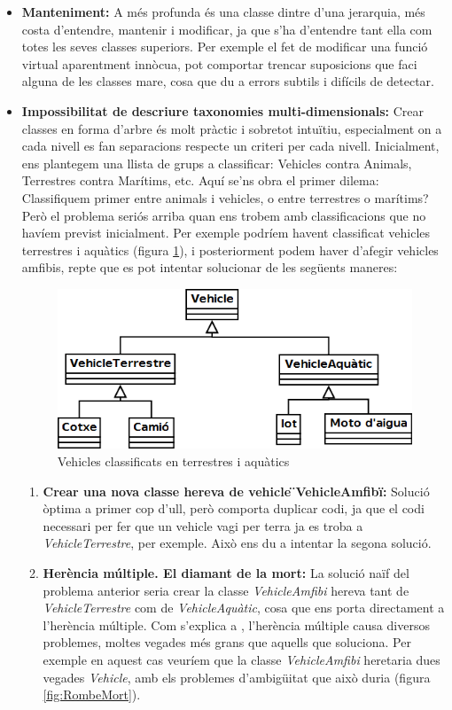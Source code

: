 \begin{itemize}
  \item {\bf Manteniment:} A més profunda és una classe dintre d'una jerarquia, més costa d'entendre, mantenir i modificar, ja que s'ha d'entendre tant ella com totes les seves classes superiors. Per exemple el fet de modificar una funció virtual aparentment innòcua, pot comportar trencar suposicions que faci alguna de les classes mare, cosa que du a errors subtils i difícils de detectar.
    
  \item {\bf Impossibilitat de descriure taxonomies multi-dimensionals:} Crear classes en forma d'arbre és molt pràctic i sobretot intuïtiu, especialment on a cada nivell es fan separacions respecte un criteri per cada nivell. Inicialment, ens plantegem una llista de grups a classificar: Vehicles contra Animals, Terrestres contra Marítims, etc. Aquí se'ns obra el primer dilema: Classifiquem primer entre animals i vehicles, o entre terrestres o marítims? Però el problema seriós arriba quan ens trobem amb classificacions que no havíem previst inicialment. Per exemple podríem havent classificat vehicles terrestres i aquàtics (figura \ref{fig:Vehicles}), i posteriorment podem haver d'afegir vehicles amfibis, repte que es pot intentar solucionar de les següents maneres:
  
  \begin{figure}
    \centering
    \includegraphics[width=0.58\linewidth]{./img/Vehicles.png}
    \caption{Vehicles classificats en terrestres i aquàtics \label{fig:Vehicles}}
  \end{figure}
  
    \begin{enumerate}
      \item {\bf Crear una nova classe hereva de vehicle \"{}VehicleAmfibi\"{}:} Solució òptima a primer cop d'ull, però comporta duplicar codi, ja que el codi necessari per fer que un vehicle vagi per terra ja es troba a {\em VehicleTerrestre}, per exemple. Això ens du a intentar la segona solució.
      
      \item {\bf Herència múltiple. El diamant de la mort:} La solució naïf del problema anterior seria crear la classe {\em VehicleAmfibi} hereva tant de {\em VehicleTerrestre} com de {\em VehicleAquàtic}, cosa que ens porta directament a l'herència múltiple. Com s'explica a \cite[p.~2]{Martin97}, l'herència múltiple causa diversos problemes, moltes vegades més grans que aquells que soluciona. Per exemple en aquest cas veuríem que la classe {\em VehicleAmfibi} heretaria dues vegades {\em Vehicle}, amb els problemes d'ambigüitat que això duria (figura \ref{fig:RombeMort}).
        

\end{enumerate}
\end{itemize}
